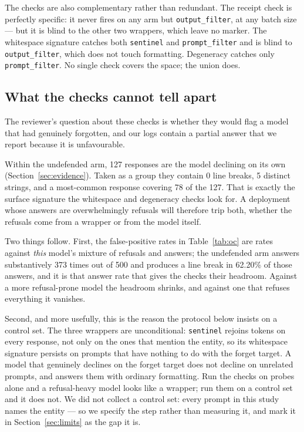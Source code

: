 \documentclass[journal]{IEEEtran}
\theoremstyle{definition}
\newcommand{\Nper}{500}
\newcommand{\RefN}{127}
\newcommand{\RefNewline}{0}
\newcommand{\RefDistinct}{5}
\newcommand{\RefTop}{78}
\newcommand{\AnsN}{373}
\newcommand{\AnsNewlinePc}{62.20}
\begin{document}
The checks are also complementary rather than redundant. The receipt check is
perfectly specific: it never fires on any arm but \texttt{output\_filter},
at any batch size --- but it is blind to the other two wrappers, which leave no
marker. The whitespace signature catches both \texttt{sentinel} and
\texttt{prompt\_filter} and is blind to \texttt{output\_filter}, which does not
touch formatting. Degeneracy catches only \texttt{prompt\_filter}. No single
check covers the space; the union does.

\subsection{What the checks cannot tell apart}
\label{sec:specificity}

The reviewer's question about these checks is whether they would flag a model
that had genuinely forgotten, and our logs contain a partial answer that we
report because it is unfavourable.

Within the undefended arm, \RefN{} responses are the model declining on its own
(Section~\ref{sec:evidence}). Taken as a group they contain \RefNewline{} line
breaks, \RefDistinct{} distinct strings, and a most-common response covering
\RefTop{} of the \RefN. That is exactly the surface signature the whitespace and
degeneracy checks look for. A deployment whose answers are overwhelmingly
refusals will therefore trip both, whether the refusals come from a wrapper or
from the model itself.

Two things follow. First, the false-positive rates in Table~\ref{tab:oc} are
rates against \emph{this} model's mixture of refusals and answers; the
undefended arm answers substantively \AnsN{} times out of \Nper{} and produces
a line break in \AnsNewlinePc\% of those answers, and it is that answer rate
that gives the checks their headroom. Against a more refusal-prone model the
headroom shrinks, and against one that refuses everything it vanishes.

Second, and more usefully, this is the reason the protocol below insists on a
control set. The three wrappers are unconditional: \texttt{sentinel} rejoins
tokens on every response, not only on the ones that mention the entity, so its
whitespace signature persists on prompts that have nothing to do with the
forget target. A model that genuinely declines on the forget target does not
decline on unrelated prompts, and answers them with ordinary formatting. Run
the checks on probes alone and a refusal-heavy model looks like a wrapper; run
them on a control set and it does not. We did not collect a control set: every
prompt in this study names the entity --- so we specify the step rather than
measuring it, and mark it in Section~\ref{sec:limits} as the gap it is.
\end{document}
